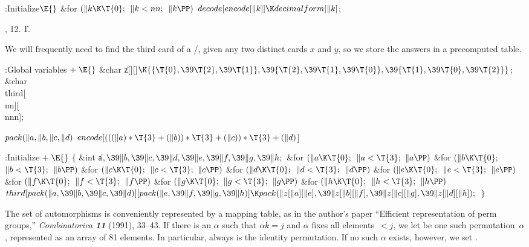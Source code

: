 \B{}:Initialize\X${}\E{}$\6
\&{for} ${}(\|k\K\T{0};{}$ ${}\|k<\\{nn};{}$ ${}\|k\PP){}$\1\5
${}\\{decode}[\\{encode}[\|k]]\K\\{decimalform}[\|k]{}$;\2\par
{}, 12.
\U1.\fi

We will frequently need to find the third card of a \SET/,
given any two distinct cards $x$ and $y$, so we store the answers
in a precomputed table.

\Y\B\4:Global variables\X${}\mathrel+\E{}$\6
\&{char} \|z[][]${}\K\{\{\T{0},\39\T{2},\39\T{1}\},\39\{\T{2},\39%
\T{1},\39\T{0}\},\39\{\T{1},\39\T{0},\39\T{2}\}\}{}$;\6
\&{char} \\{third}[\\{nn}][\\{nnn}];\par
\fi

\B\D$\\{pack}(\|a,\|b,\|c,\|d)$ \5
$\\{encode}[(((\|a)*\T{3}+(\|b))*\T{3}+(\|c))*\T{3}+(\|d){}$]\par
\Y\B\4:Initialize\X${}\mathrel+\E{}$\6
${}\{{}$\1\6
\&{int} \|a${},\39\|b,\39\|c,\39\|d,\39\|e,\39\|f,\39\|g,\39\|h;{}$\7
\&{for} ${}(\|a\K\T{0};{}$ ${}\|a<\T{3};{}$ ${}\|a\PP){}$\1\6
\&{for} ${}(\|b\K\T{0};{}$ ${}\|b<\T{3};{}$ ${}\|b\PP){}$\1\6
\&{for} ${}(\|c\K\T{0};{}$ ${}\|c<\T{3};{}$ ${}\|c\PP){}$\1\6
\&{for} ${}(\|d\K\T{0};{}$ ${}\|d<\T{3};{}$ ${}\|d\PP){}$\1\6
\&{for} ${}(\|e\K\T{0};{}$ ${}\|e<\T{3};{}$ ${}\|e\PP){}$\1\6
\&{for} ${}(\|f\K\T{0};{}$ ${}\|f<\T{3};{}$ ${}\|f\PP){}$\1\6
\&{for} ${}(\|g\K\T{0};{}$ ${}\|g<\T{3};{}$ ${}\|g\PP){}$\1\6
\&{for} ${}(\|h\K\T{0};{}$ ${}\|h<\T{3};{}$ ${}\|h\PP){}$\1\5
${}\\{third}[\\{pack}(\|a,\39\|b,\39\|c,\39\|d)][\\{pack}(\|e,\39\|f,\39\|g,\39%
\|h)]\K\\{pack}(\|z[\|a][\|e],\39\|z[\|b][\|f],\39\|z[\|c][\|g],\39\|z[\|d][%
\|h]);{}$\2\2\2\2\2\2\2\2\6
\4${}\}{}$\2\par
\fi

The set of automorphisms is conveniently represented by a mapping
table, as in the author's paper ``Efficient representation of
perm groups,'' {\sl Combinatorica\/ \bf11} (1991), 33--43.
If there is an $\alpha$ such that $\alpha k=j$ and $\alpha$ fixes
all elements~$<j$, we let  be one such permutation~$%
\alpha$,
represented as an array of 81 elements. In particular, 
always is
the identity permutation. If no such $\alpha$ exists, however, we set
.

